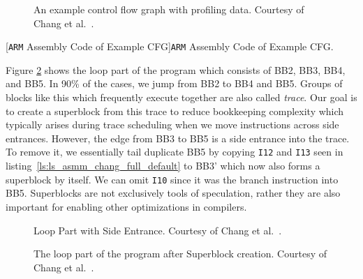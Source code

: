 \clearpage
\begin{center}
    \begin{minipage}{.69\textwidth}
        \begin{figure}[H]
            \centering
            
            \caption[Example Control Flow Graph with Profiling Data]{An example control flow graph with profiling data. Courtesy of Chang et al.~\cite{chang95}.}
            \label{fig:controlflow_full}
\end{figure}
    \end{minipage}\hfill
    \begin{minipage}{.31\textwidth}
    
        \captionsetup{type=listing}
        [\texttt{ARM} Assembly Code of Example CFG]{\texttt{ARM} Assembly Code of Example CFG.}
        \label{ls:ls_asmm_chang_full_default}
    \end{minipage}
\end{center} 


Figure \ref{fig:controlflow_side_enterance} shows the loop part of the program which consists of BB2, BB3, BB4, and BB5. In 90\% of the cases, we jump from BB2 to BB4 and BB5. Groups of blocks like this which frequently execute together are also called \textit{trace}. Our goal is to create a superblock from this trace to reduce bookkeeping complexity which typically arises during trace scheduling when we move instructions across side entrances. However, the edge from BB3 to BB5 is a side entrance into the trace. To remove it, we essentially tail duplicate BB5 by copying \texttt{I12} and \texttt{I13} seen in listing~\ref{ls:ls_asmm_chang_full_default}  to BB3' which now also forms a superblock by itself. We can omit \texttt{I10} since it was the branch instruction into BB5. Superblocks are not exclusively tools of speculation, rather they are also important for enabling other optimizations in compilers. 

\begin{center}
    \begin{minipage}{.38\textwidth}
        \begin{figure}[H]
            \centering
            \resizebox{1\textwidth}{!}{
            
        }
        \caption[Loop Part with Side Entrance]{Loop Part with Side Entrance. Courtesy of Chang et al.~\cite{chang95}.}
        \label{fig:controlflow_side_enterance}
\end{figure}
    \end{minipage}\hfill
    \begin{minipage}{.58\textwidth}
    \begin{figure}[H]
        \centering
        \resizebox{1\textwidth}{!}{
            
        }
        \caption[Loop Part Superblock Example]{The loop part of the program after Superblock creation. Courtesy of Chang et al.~\cite{chang95}.}
        \label{fig:controlflow_superblock}
\end{figure}
    \end{minipage}
\end{center} 


